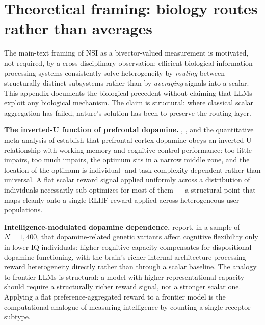\documentclass{article}
\begin{document}
\appendix

\section{Theoretical framing: biology routes rather than averages}
\label{app:biology}

The main-text framing of NSI as a bivector-valued measurement is motivated, not required, by a cross-disciplinary observation: efficient biological information-processing systems consistently solve heterogeneity by \emph{routing} between structurally distinct subsystems rather than by \emph{averaging} signals into a scalar. This appendix documents the biological precedent without claiming that LLMs exploit any biological mechanism. The claim is structural: where classical scalar aggregation has failed, nature's solution has been to preserve the routing layer.

\textbf{The inverted-U function of prefrontal dopamine.} \citet{arnsten2012neuromodulation}, \citet{cools2011invertedu}, and the quantitative meta-analysis of \citet{weber2022quantifying} establish that prefrontal-cortex dopamine obeys an inverted-U relationship with working-memory and cognitive-control performance: too little impairs, too much impairs, the optimum sits in a narrow middle zone, and the location of the optimum is individual- and task-complexity-dependent rather than universal. A flat scalar reward signal applied uniformly across a distribution of individuals necessarily sub-optimizes for most of them --- a structural point that maps cleanly onto a single RLHF reward applied across heterogeneous user populations.

\textbf{Intelligence-modulated dopamine dependence.} \citet{giannitelli2021dopamineiq} report, in a sample of $N=1{,}400$, that dopamine-related genetic variants affect cognitive flexibility only in lower-IQ individuals: higher cognitive capacity compensates for dispositional dopamine functioning, with the brain's richer internal architecture processing reward heterogeneity directly rather than through a scalar baseline. The analogy to frontier LLMs is structural: a model with higher representational capacity should require a structurally richer reward signal, not a stronger scalar one. Applying a flat preference-aggregated reward to a frontier model is the computational analogue of measuring intelligence by counting a single receptor subtype.
\end{document}
